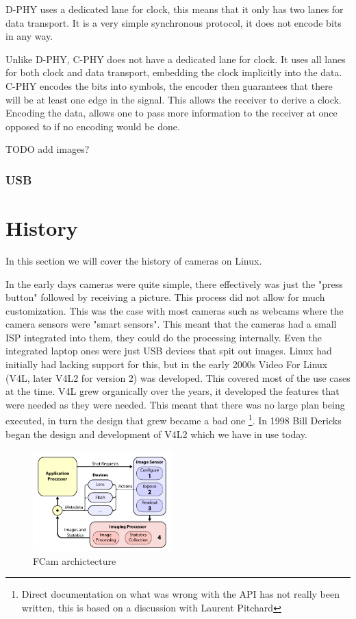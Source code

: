 D-PHY uses a dedicated lane for clock, this means that it only has two lanes for
data transport. It is a very simple synchronous protocol, it does not encode
bits in any way.

Unlike D-PHY, C-PHY does not have a dedicated lane for clock. It uses all lanes
for both clock and data transport, embedding the clock implicitly into the
data. C-PHY encodes the bits into symbols, the encoder then guarantees that
there will be at least one edge in the signal. This allows the receiver to
derive a clock. Encoding the data, allows one to pass more information to the
receiver at once opposed to if no encoding would be done.

TODO add images?

\subsubsection{USB}

\section{History}
In this section we will cover the history of cameras on Linux.

In the early days cameras were quite simple, there effectively was just the
"press button" followed by receiving a picture. This process did not allow for
much customization. This was the case with most cameras such as webcams where
the camera sensors were "smart sensors". This meant that the cameras had a small
ISP integrated into them, they could do the processing internally. Even the
integrated laptop ones were just USB devices that spit out images. Linux had
initially had lacking support for this, but in the early 2000s Video For Linux
(V4L, later V4L2 for version 2) was developed. This covered most of the use
cases at the time. V4L grew organically over the years, it developed the
features that were needed as they were needed. This meant that there was no
large plan being executed, in turn the design that grew became a bad one
\footnote{Direct documentation on what was wrong with the API has not really
been written, this is based on a discussion with Laurent Pitchard}.
In 1998 Bill Dericks began the design and development of V4L2 which we have in
use today.

\begin{figure}
    \centering
    \includegraphics[width=0.48\textwidth]{figures/fcam_arch.png}
    \caption{FCam archictecture \cite{adams2010frankencamera}}
    \label{fig:fcam_api}
\end{figure}

